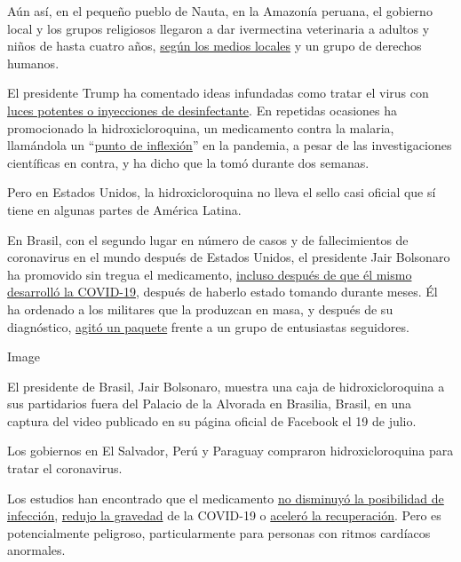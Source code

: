 Aún así, en el pequeño pueblo de Nauta, en la Amazonía peruana, el
gobierno local y los grupos religiosos llegaron a dar ivermectina
veterinaria a adultos y niños de hasta cuatro años,
\href{https://www.youtube.com/watch?v=b7d6ICDRbzo\&feature=youtu.be\&fbclid=IwAR2AxONvP6C8FWbkRAtQRgA-iC4wQm4DNutT1RbaRnk0kf9hivTQx8Fgmm0}{según
los medios locales} y un grupo de derechos humanos.

El presidente Trump ha comentado ideas infundadas como tratar el virus
con
\href{https://www.nytimes.com/2020/04/24/health/sunlight-coronavirus-trump.html}{luces
potentes o inyecciones de desinfectante}. En repetidas ocasiones ha
promocionado la hidroxicloroquina, un medicamento contra la malaria,
llamándola un
``\href{https://www.nytimes.com/2020/04/17/health/trump-hydroxychloroquine-coronavirus.html}{punto
de inflexión}'' en la pandemia, a pesar de las investigaciones
científicas en contra, y ha dicho que la tomó durante dos semanas.

Pero en Estados Unidos, la hidroxicloroquina no lleva el sello casi
oficial que sí tiene en algunas partes de América Latina.

En Brasil, con el segundo lugar en número de casos y de fallecimientos
de coronavirus en el mundo después de Estados Unidos, el presidente Jair
Bolsonaro ha promovido sin tregua el medicamento,
\href{https://www.nytimes.com/2020/07/08/world/americas/brazil-bolsonaro-covid-coronavirus.html}{incluso
después de que él mismo desarrolló la COVID-19}, después de haberlo
estado tomando durante meses. Él ha ordenado a los militares que la
produzcan en masa, y después de su diagnóstico,
\href{https://twitter.com/SamPancher/status/1284974259698380801?s=19}{agitó
un paquete} frente a un grupo de entusiastas seguidores.

Image

El presidente de Brasil, Jair Bolsonaro, muestra una caja de
hidroxicloroquina a sus partidarios fuera del Palacio de la Alvorada en
Brasilia, Brasil, en una captura del video publicado en su página
oficial de Facebook el 19 de julio.

Los gobiernos en El Salvador, Perú y Paraguay compraron
hidroxicloroquina para tratar el coronavirus.

Los estudios han encontrado que el medicamento
\href{https://www.nytimes.com/2020/06/03/health/hydroxychloroquine-coronavirus-trump.html}{no
disminuyó la posibilidad de infección},
\href{https://www.acpjournals.org/doi/10.7326/M20-4207}{redujo la
gravedad} de la COVID-19 o
\href{https://www.recoverytrial.net/news/statement-from-the-chief-investigators-of-the-randomised-evaluation-of-covid-19-therapy-recovery-trial-on-hydroxychloroquine-5-june-2020-no-clinical-benefit-from-use-of-hydroxychloroquine-in-hospitalised-patients-with-covid-19}{aceleró
la recuperación}. Pero es potencialmente peligroso, particularmente para
personas con ritmos cardíacos anormales.

